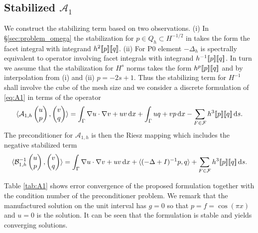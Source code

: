 \subsection{Stabilized $\mathcal{A}_1$} We construct the stabilizing term
based on two observations. (i) In \S\ref{sec:problem_omega} the stabilization
for $p\in Q_h\subset H^{-1/2}$ in takes the form the facet integral with integrand $h^{2}[\![p]\!][\![q]\!]$.
(ii) For P0 element $-\Delta_h$ is spectrally equivalent to operator involving
facet integrals with integrand $h^{-1}[\![p]\!][\![q]\!]$. In turn we assume
that the stabilization for $H^s$ norms takes the form $h^{p}[\![p]\!][\![q]\!]$
and by interpolation from (i) and (ii) $p=-2s+1$. Thus the stabilizing term for $H^{-1}$ shall
involve the cube of the mesh size and we consider a discrete formulation of \eqref{eq:A1}
in terms of the operator
%
\[
\langle\mathcal{A}_{1, h}\begin{pmatrix}u\\p\end{pmatrix},
  \begin{pmatrix}v\\q\end{pmatrix}
    \rangle
    =
    \int_{\Gamma}\nabla u\cdot\nabla v+uv\,\mathrm{d}x+\int_{\Gamma}uq + vp\,\mathrm{d}x-
    \sum_{F\in\mathcal{F}}h^3[\![p]\!][\![q]\!]\,\mathrm{d}s.
\]
The preconditioner for $\mathcal{A}_{1, h}$ is then the Riesz mapping which
includes the negative stabilized term
\[
\langle\mathcal{B}^{-1}_{1, h}\begin{pmatrix}u\\p\end{pmatrix},
  \begin{pmatrix}v\\q\end{pmatrix}
    \rangle
    =
    \int_{\Gamma}\nabla u\cdot\nabla v+uv\,\mathrm{d}x+
    \langle(-\Delta+I)^{-1}p, q\rangle+
    \sum_{F\in\mathcal{F}}h^3[\![p]\!][\![q]\!]\,\mathrm{d}s.
\]

Table \ref{tab:A1} shows error convergence of the proposed formulation
together with the condition number of the preconditioner problem. We remark
that the manufactured solution on the unit interval has $g=0$ so that $p=f=\cos(\pi x)$
and $u=0$ is the solution. It can be seen that the formulation is stable and
yields converging solutions.

